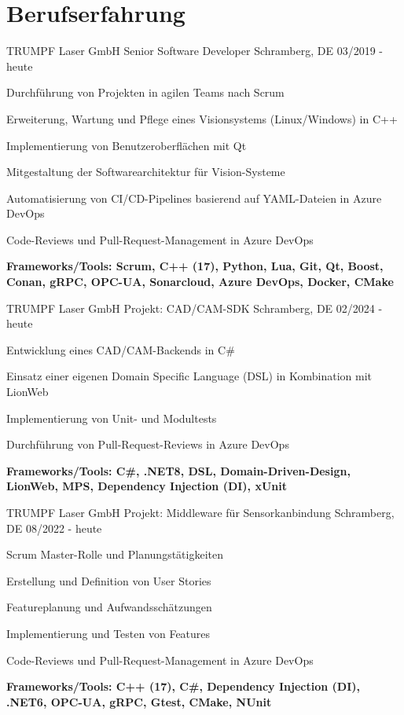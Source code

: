 \section{Berufserfahrung}

\cventry
{TRUMPF Laser GmbH} %
{Senior Software Developer} %
{Schramberg, DE} %
{03/2019 - heute} %
\begin{cvitems}
    \item {Durchführung von Projekten in agilen Teams nach Scrum}
    \item {Erweiterung, Wartung und Pflege eines Visionsystems (Linux/Windows) in C++}
    \item {Implementierung von Benutzeroberflächen mit Qt}
    \item {Mitgestaltung der Softwarearchitektur für Vision-Systeme}
    \item {Automatisierung von CI/CD-Pipelines basierend auf YAML-Dateien in Azure DevOps}
    \item {Code-Reviews und Pull-Request-Management in Azure DevOps}
    \item {\textbf{Frameworks/Tools: Scrum, C++ (17), Python, Lua, Git, Qt, Boost, Conan, gRPC, OPC-UA, Sonarcloud, Azure DevOps, Docker, CMake}}
\end{cvitems}

\cventry
{TRUMPF Laser GmbH} %
{Projekt: CAD/CAM-SDK} %
{Schramberg, DE} %
{02/2024 - heute} %
\begin{cvitems}
    \item {Entwicklung eines CAD/CAM-Backends in C\#}
    \item {Einsatz einer eigenen Domain Specific Language (DSL) in Kombination mit LionWeb}
    \item {Implementierung von Unit- und Modultests}
    \item {Durchführung von Pull-Request-Reviews  in Azure DevOps}
    \item {\textbf{Frameworks/Tools: C\#, .NET8, DSL, Domain-Driven-Design, LionWeb, MPS, Dependency Injection (DI), xUnit}}
\end{cvitems}

\cventry
{TRUMPF Laser GmbH} %
{Projekt: Middleware für Sensorkanbindung} %
{Schramberg, DE} %
{08/2022 - heute} %
\begin{cvitems}
    \item {Scrum Master-Rolle und Planungstätigkeiten}
    \item {Erstellung und Definition von User Stories}
    \item {Featureplanung und Aufwandsschätzungen}
    \item {Implementierung und Testen von Features}
    \item {Code-Reviews und Pull-Request-Management in Azure DevOps}
    \item {\textbf{Frameworks/Tools: C++ (17), C\#, Dependency Injection (DI), .NET6, OPC-UA, gRPC, Gtest, CMake, NUnit}}
\end{cvitems}

